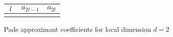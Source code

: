 \documentclass[11pt, oneside]{article}
\begin{document}
\newcommand{\dval}{2}    %
\newcommand{\ORDval}{30} %

\begin{center}
\renewcommand{\arraystretch}{1.2}
\begin{tabular}{|c|| c| c |} 
 \hline
  $\ l \ $ & $a_{2l-1}$ & $a_{2l}$  \\ [0.5ex] 
 \hline
%
\\[0.3ex]
 \hline
\end{tabular}

\bigskip

Pade approximant coefficients for local dimension $d = \dval$
\end{center}
\end{document}
